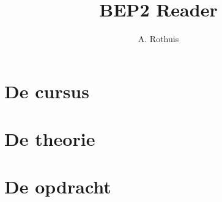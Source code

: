 \documentclass[dutch,a4paper,12pt,doubleside]{book}
\title{BEP2 Reader}
\author{A. Rothuis}
\begin{document}
\maketitle

{\hypersetup{linkcolor=black}
\tableofcontents
}


\part{De cursus}


\part{De theorie}





\part{De opdracht}










\end{document}
